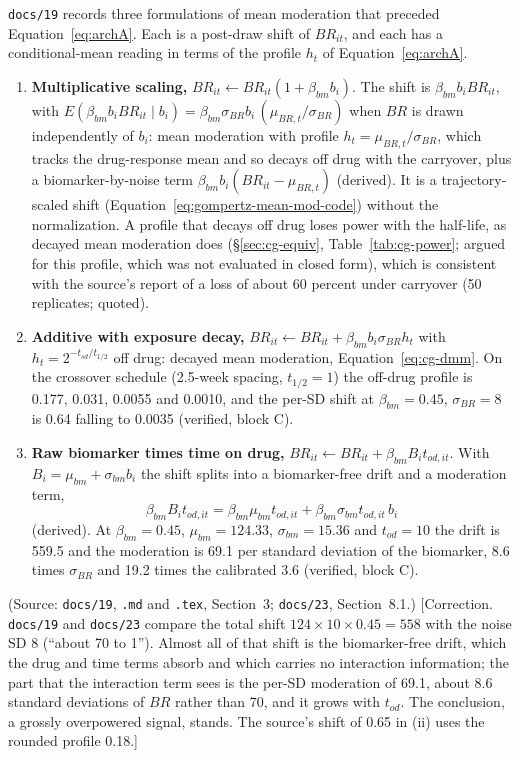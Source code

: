 \documentclass[11pt]{article}
\newcommand{\note}[1]{\textcolor{blue!60!black}{\small [#1]}}
\newcommand{\code}[1]{\texttt{#1}}
\begin{document}
\code{docs/19} records three formulations of mean moderation that
preceded Equation~\eqref{eq:archA}. Each is a post-draw shift of
$BR_{it}$, and each has a conditional-mean reading in terms of the
profile $h_t$ of Equation~\eqref{eq:archA}.
\begin{enumerate}[label=(\roman*), itemsep=2pt]
\item \textbf{Multiplicative scaling,}
  $BR_{it}\leftarrow BR_{it}(1 + \beta_{bm}b_i)$. The shift is
  $\beta_{bm}b_iBR_{it}$, with $E(\beta_{bm}b_iBR_{it} \mid b_i) =
  \beta_{bm}\sigma_{BR}b_i\,(\mu_{BR,t}/\sigma_{BR})$ when $BR$ is drawn
  independently of $b_i$: mean moderation with profile
  $h_t = \mu_{BR,t}/\sigma_{BR}$, which tracks the drug-response mean
  and so decays off drug with the carryover, plus a
  biomarker-by-noise term $\beta_{bm}b_i(BR_{it} - \mu_{BR,t})$
  (derived). It is a trajectory-scaled shift
  (Equation~\eqref{eq:gompertz-mean-mod-code}) without the
  normalization. A profile that decays off drug loses power with the
  half-life, as decayed mean moderation does (\S\ref{sec:cg-equiv},
  Table~\ref{tab:cg-power}; argued for this profile, which was not
  evaluated in closed form), which is consistent with the source's
  report of a loss of about 60 percent under carryover (50 replicates;
  quoted).
\item \textbf{Additive with exposure decay,}
  $BR_{it}\leftarrow BR_{it} + \beta_{bm}b_i\sigma_{BR}h_t$ with
  $h_t = 2^{-t_{sd}/t_{1/2}}$ off drug: decayed mean moderation,
  Equation~\eqref{eq:cg-dmm}. On the crossover schedule (2.5-week
  spacing, $t_{1/2} = 1$) the off-drug profile is 0.177, 0.031, 0.0055
  and 0.0010, and the per-SD shift at $\beta_{bm} = 0.45$,
  $\sigma_{BR} = 8$ is 0.64 falling to 0.0035 (verified, block C).
\item \textbf{Raw biomarker times time on drug,}
  $BR_{it}\leftarrow BR_{it} + \beta_{bm}B_it_{od,it}$. With
  $B_i = \mu_{bm} + \sigma_{bm}b_i$ the shift splits into a
  biomarker-free drift and a moderation term,
  \begin{equation}
  \beta_{bm}B_it_{od,it} = \beta_{bm}\mu_{bm}t_{od,it}
    + \beta_{bm}\sigma_{bm}t_{od,it}\,b_i
  \label{eq:inva-attempt3}
  \end{equation}
  (derived). At $\beta_{bm} = 0.45$, $\mu_{bm} = 124.33$,
  $\sigma_{bm} = 15.36$ and $t_{od} = 10$ the drift is 559.5 and the
  moderation is 69.1 per standard deviation of the biomarker, 8.6 times
  $\sigma_{BR}$ and 19.2 times the calibrated 3.6 (verified, block C).
\end{enumerate}
(Source: \code{docs/19}, \code{.md} and \code{.tex}, Section~3;
\code{docs/23}, Section~8.1.) \note{Correction. \code{docs/19} and
\code{docs/23} compare the total shift $124\times10\times0.45 = 558$ with
the noise SD 8 (``about 70 to 1''). Almost all of that shift is the
biomarker-free drift, which the drug and time terms absorb and which
carries no interaction information; the part that the interaction term
sees is the per-SD moderation of 69.1, about 8.6 standard deviations of
$BR$ rather than 70, and it grows with $t_{od}$. The conclusion, a
grossly overpowered signal, stands. The source's shift of 0.65 in (ii)
uses the rounded profile 0.18.}
\end{document}

